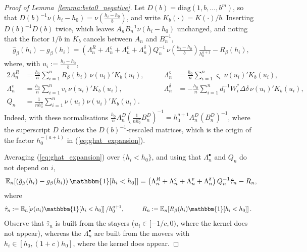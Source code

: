 \documentclass{article}
\newcommand{\E}{\mathbb{E}}
\newcommand{\I}{\mathbbm{1}}
\begin{document}
\begin{appendices}
\begin{proof}[Proof of Lemma~\ref{lemma:beta0_negative}]
Let $D(b)=\mathrm{diag}(1,b,\dots,b^m)$, so that
$D(b)^{-1}\nu(h_i-h_0)=\nu\!\left(\tfrac{h_i-h_0}{b}\right)$, and write
$K_b(\cdot)=K(\cdot)/b$. Inserting $D(b)^{-1}D(b)$ twice, which leaves
$A_nB_n^{-1}\nu(h_i-h_0)$ unchanged, and noting that the factor $1/b$ in $K_b$
cancels between $A_n$ and $B_n^{-1}$,
\begin{align}\label{eq:ghat_expansion}
    \hat{g}_\beta(h_i) - g_\beta(h_i)
    = \left(\Lambda_n^R +\Lambda_n^{\varsigma} + \Lambda_n^{v} + \Lambda_n^{\delta}\right)
      Q_n^{-1}\,\nu\!\left(\tfrac{h_i-h_0}{b}\right)\frac{1}{h_0^{a+1}}
      -R_{\beta}(h_i),
\end{align}
where, with $u_i:=\tfrac{h_i-h_0}{b}$,
\begin{alignat*}{2}
    \Lambda_n^R &= \frac{h_0}{n}\sum_{i=1}^n R_{\beta}(h_i)\,\nu(u_i)'K_b(u_i),
    &\qquad
    \Lambda_n^{\varsigma} &= \frac{h_0}{n}\sum_{i=1}^n \varsigma_i\,\nu(u_i)'K_b(u_i),\\
    \Lambda_n^{v} &= \frac{h_0}{n}\sum_{i=1}^n v_i\,\nu(u_i)'K_b(u_i),
    &\qquad
    \Lambda_n^{\delta} &= -\frac{h_0}{n}\sum_{i=1}^n d_i^{-1}W_i^{*}\Delta \delta\,
        \nu(u_i)'K_b(u_i),\\
     Q_n &= \frac{1}{nh_0^a}\sum_{i=1}^n \nu(u_i)\nu(u_i)'K_b(u_i).
\end{alignat*}
 Indeed, with
these normalisations
$\frac{h_0}{n}A_n^{D}\left(\frac{1}{nh_0^{a}}B_n^{D}\right)^{-1}
=h_0^{a+1}A_n^{D}(B_n^{D})^{-1}$, where the superscript $D$ denotes the
$D(b)^{-1}$-rescaled matrices, which is the origin of the factor $h_0^{-(a+1)}$
in (\ref{eq:ghat_expansion}).
 
Averaging (\ref{eq:ghat_expansion}) over $\{h_i<h_0\}$, and using that
$\Lambda_n^{\bullet}$ and $Q_n$ do not depend on $i$,
\begin{align}\label{eq:beta0neg_master}
    \E_n\!\left[\left(\hat{g}_\beta(h_i) - g_\beta(h_i)\right)\I[h_i<h_0]\right]
    = \left(\Lambda_n^R +\Lambda_n^{\varsigma} + \Lambda_n^{v} + \Lambda_n^{\delta}\right)
      Q_n^{-1}\hat{\tau}_n - R_n,
\end{align}
where
\begin{alignat*}{2}
    \hat{\tau}_n &:= \E_n\!\left[\nu(u_i)\I[h_i<h_0]\right]/h_0^{a+1},
    &\qquad
    R_n &:= \E_n\!\left[R_{\beta}(h_i)\I[h_i<h_0]\right].
\end{alignat*}
Observe that $\hat\tau_n$ is built from the stayers ($u_i\in[-1/c,0)$, where the
kernel does not appear), whereas the $\Lambda_n^{\bullet}$ are built from the
movers with $h_i\in[h_0,(1+c)h_0]$, where the kernel does appear.



\end{proof}
\end{appendices}
\end{document}
